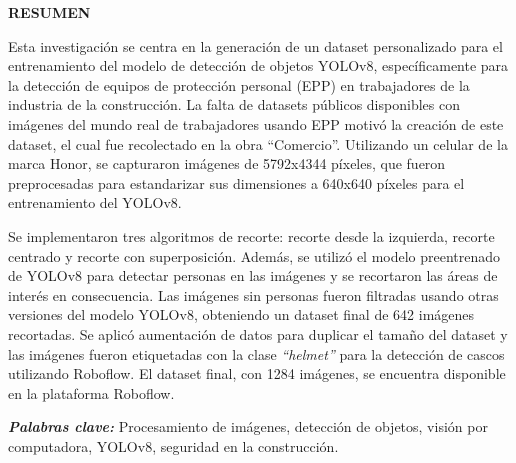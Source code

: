 \thispagestyle{plain}

\newpage

\begin{center}
  \textbf{RESUMEN}
\end{center}

\vspace{1cm}

Esta investigación se centra en la generación de un dataset personalizado para el entrenamiento del modelo de detección de objetos YOLOv8, específicamente para la detección de equipos de protección personal (EPP) en trabajadores de la industria de la construcción. La falta de datasets públicos disponibles con imágenes del mundo real de trabajadores usando EPP motivó la creación de este dataset, el cual fue recolectado en la obra ``Comercio''. Utilizando un celular  de la marca Honor, se capturaron imágenes de 5792x4344 píxeles, que fueron preprocesadas para estandarizar sus dimensiones a 640x640 píxeles para el entrenamiento del YOLOv8.

Se implementaron tres algoritmos de recorte: recorte desde la izquierda, recorte centrado y recorte con superposición. Además, se utilizó el modelo preentrenado de YOLOv8 para detectar personas en las imágenes y se recortaron las áreas de interés en consecuencia. Las imágenes sin personas fueron filtradas usando otras versiones del modelo YOLOv8, obteniendo un dataset final de 642 imágenes recortadas. Se aplicó aumentación de datos para duplicar el tamaño del dataset y las imágenes fueron etiquetadas con la clase \textit{``helmet''}  para la detección de cascos utilizando Roboflow. El dataset final, con 1284 imágenes, se encuentra disponible en la plataforma Roboflow.

\textit{\textbf{Palabras clave:}} Procesamiento de imágenes, detección de objetos, visión por computadora, YOLOv8, seguridad en la construcción.

\vfill

\pagebreak